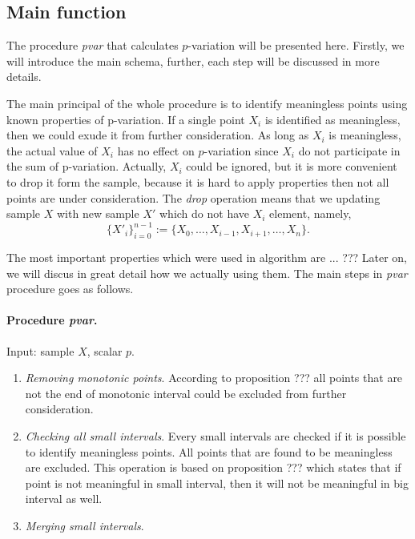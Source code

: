 \documentclass[12pt, a4paper]{article}
\numberwithin{equation}{section}
\begin{document}
\subsection{Main function}

The procedure \emph{pvar} that calculates
$p$-variation will be presented here. Firstly,
we will introduce the main schema, further, each step will
be discussed in more details. 

The main principal of the whole procedure is to identify 
meaningless points using known properties of p-variation.
If a single point $X_i$ is identified 
as meaningless, then we could exude it from further consideration.
As long as $X_i$ is meaningless, the actual value of 
$X_i$ has no effect on $p$-variation since $X_i$ do not participate 
in the sum of p-variation. Actually, $X_i$ could be ignored,
but it is more convenient to drop it form the sample,
because it is hard to apply properties then not all points are under consideration. 
The \emph{drop} operation means that we 
updating sample $X$ with new sample $X'$ which do not have
$X_i$ element, namely,  
$$
\{X'_{i}\}_{i=0}^{n-1}:=\{X_0,\dots,X_{i-1},X_{i+1},\dots,X_n\}.
$$


The most important properties which were used in algorithm are
 ... ??? 
Later on, we will
discus in great detail how we actually using them.
The main steps in \emph{pvar} procedure
goes as follows.


\paragraph{Procedure \emph{pvar}.}
Input: sample $X$, scalar $p$.

\begin{enumerate}
  \item \emph{Removing monotonic points}. According to proposition ???
  all points that are not the end of monotonic interval could be excluded 
  from further consideration. 
  
  \item \emph{Checking all small intervals}. Every small intervals are
    checked if it is possible to identify meaningless points. All points
    that are found to be meaningless are excluded. 
    This operation is based on proposition ??? which states that 
    if point is not meaningful in small interval, then it will not be
    meaningful in big interval as well.
 
  \item \emph{Merging small intervals}.  
  
\end{enumerate}
\end{document}
